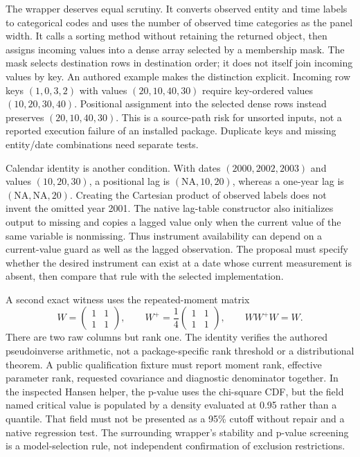 The wrapper deserves equal scrutiny. It converts observed entity and time labels to categorical codes and uses the number of observed time categories as the panel width. It calls a sorting method without retaining the returned object, then assigns incoming values into a dense array selected by a membership mask. The mask selects destination rows in destination order; it does not itself join incoming values by key. An authored example makes the distinction explicit. Incoming row keys $(1,0,3,2)$ with values $(20,10,40,30)$ require key-ordered values $(10,20,30,40)$. Positional assignment into the selected dense rows instead preserves $(20,10,40,30)$. This is a source-path risk for unsorted inputs, not a reported execution failure of an installed package. Duplicate keys and missing entity/date combinations need separate tests.\citep{exec25_cdyn_panelvar,exec25_cdyn_choice}

Calendar identity is another condition. With dates $(2000,2002,2003)$ and values $(10,20,30)$, a positional lag is $(\mathrm{NA},10,20)$, whereas a one-year lag is $(\mathrm{NA},\mathrm{NA},20)$. Creating the Cartesian product of observed labels does not invent the omitted year 2001. The native lag-table constructor also initializes output to missing and copies a lagged value only when the current value of the same variable is nonmissing. Thus instrument availability can depend on a current-value guard as well as the lagged observation. The proposal must specify whether the desired instrument can exist at a date whose current measurement is absent, then compare that rule with the selected implementation.\citep{exec25_cdyn_panelvar,exec25_cdyn_choice}

A second exact witness uses the repeated-moment matrix
\[
 W=\begin{pmatrix}1&1\\1&1\end{pmatrix},\qquad
 W^+=\frac14\begin{pmatrix}1&1\\1&1\end{pmatrix},\qquad WW^+W=W.
\]
There are two raw columns but rank one. The identity verifies the authored pseudoinverse arithmetic, not a package-specific rank threshold or a distributional theorem. A public qualification fixture must report moment rank, effective parameter rank, requested covariance and diagnostic denominator together. In the inspected Hansen helper, the p-value uses the chi-square CDF, but the field named critical value is populated by a density evaluated at 0.95 rather than a quantile. That field must not be presented as a 95\% cutoff without repair and a native regression test. The surrounding wrapper's stability and p-value screening is a model-selection rule, not independent confirmation of exclusion restrictions.\citep{exec25_cdyn_panelvar,exec25_cdyn_choice}

